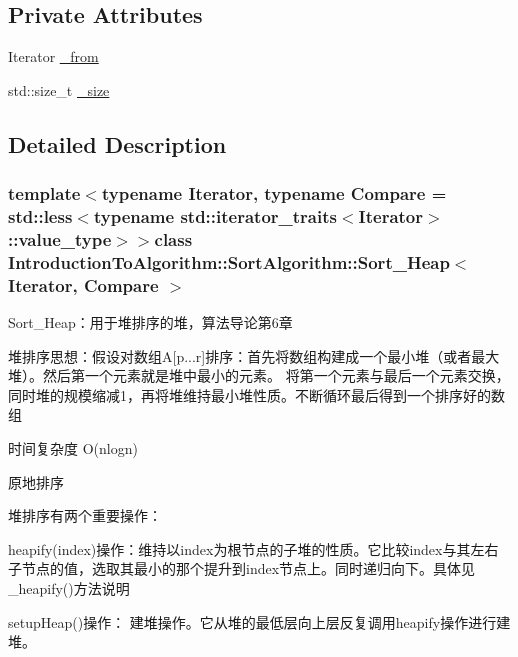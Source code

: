 \subsection*{Private Attributes}
\begin{DoxyCompactItemize}
\item 
Iterator \hyperlink{class_introduction_to_algorithm_1_1_sort_algorithm_1_1_sort___heap_a9d05a5cc5c276302911ddeefbae0d9c4}{\+\_\+from}
\item 
std\+::size\+\_\+t \hyperlink{class_introduction_to_algorithm_1_1_sort_algorithm_1_1_sort___heap_a7d35f22bc361d54b1665e0fbfe37e2d5}{\+\_\+size}
\end{DoxyCompactItemize}


\subsection{Detailed Description}
\subsubsection*{template$<$typename Iterator, typename Compare = std\+::less$<$typename std\+::iterator\+\_\+traits$<$\+Iterator$>$\+::value\+\_\+type$>$$>$class Introduction\+To\+Algorithm\+::\+Sort\+Algorithm\+::\+Sort\+\_\+\+Heap$<$ Iterator, Compare $>$}

Sort\+\_\+\+Heap：用于堆排序的堆，算法导论第6章 


\begin{DoxyItemize}
\item 堆排序思想：假设对数组\+A\mbox{[}p...r\mbox{]}排序：首先将数组构建成一个最小堆（或者最大堆）。然后第一个元素就是堆中最小的元素。 将第一个元素与最后一个元素交换，同时堆的规模缩减1，再将堆维持最小堆性质。不断循环最后得到一个排序好的数组
\item 时间复杂度 O(nlogn)
\item 原地排序
\end{DoxyItemize}

堆排序有两个重要操作：


\begin{DoxyItemize}
\item heapify(index)操作：维持以index为根节点的子堆的性质。它比较index与其左右子节点的值，选取其最小的那个提升到index节点上。同时递归向下。具体见\+\_\+heapify()方法说明
\item setup\+Heap()操作： 建堆操作。它从堆的最低层向上层反复调用heapify操作进行建堆。 
\end{DoxyItemize}

